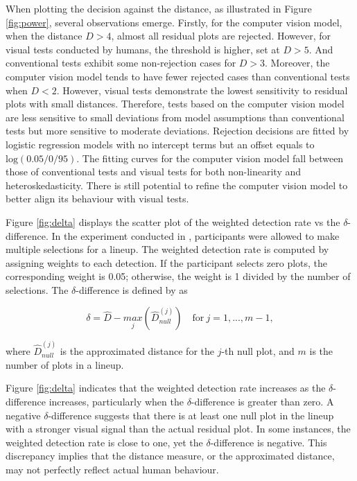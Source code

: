 \documentclass[]{interact}
\theoremstyle{plain}%
\theoremstyle{definition}
\theoremstyle{remark}
\begin{document}
When plotting the decision against the distance, as illustrated in
Figure \ref{fig:power}, several observations emerge. Firstly, for the
computer vision model, when the distance \(D > 4\), almost all residual
plots are rejected. However, for visual tests conducted by humans, the
threshold is higher, set at \(D > 5\). And conventional tests exhibit
some non-rejection cases for \(D > 3\). Moreover, the computer vision
model tends to have fewer rejected cases than conventional tests when
\(D < 2\). However, visual tests demonstrate the lowest sensitivity to
residual plots with small distances. Therefore, tests based on the
computer vision model are less sensitive to small deviations from model
assumptions than conventional tests but more sensitive to moderate
deviations. Rejection decisions are fitted by logistic regression models
with no intercept terms but an offset equals to
\(\text{log}(0.05/0/95)\). The fitting curves for the computer vision
model fall between those of conventional tests and visual tests for both
non-linearity and heteroskedasticity. There is still potential to refine
the computer vision model to better align its behaviour with visual
tests.

Figure \ref{fig:delta} displays the scatter plot of the weighted
detection rate vs the \(\delta\)-difference. In the experiment conducted
in \citet{li2023plot}, participants were allowed to make multiple
selections for a lineup. The weighted detection rate is computed by
assigning weights to each detection. If the participant selects zero
plots, the corresponding weight is 0.05; otherwise, the weight is 1
divided by the number of selections. The \(\delta\)-difference is
defined by \citet{chowdhury2018measuring} as

\begin{equation}
\delta = \hat{D} - \underset{j}{max}\left(\hat{D}_{null}^{(j)}\right) \quad \text{for}~j = 1,...,m-1,
\end{equation}

\noindent where \(\hat{D}_{null}^{(j)}\) is the approximated distance
for the \(j\)-th null plot, and \(m\) is the number of plots in a
lineup.

Figure \ref{fig:delta} indicates that the weighted detection rate
increases as the \(\delta\)-difference increases, particularly when the
\(\delta\)-difference is greater than zero. A negative
\(\delta\)-difference suggests that there is at least one null plot in
the lineup with a stronger visual signal than the actual residual plot.
In some instances, the weighted detection rate is close to one, yet the
\(\delta\)-difference is negative. This discrepancy implies that the
distance measure, or the approximated distance, may not perfectly
reflect actual human behaviour.
\end{document}
